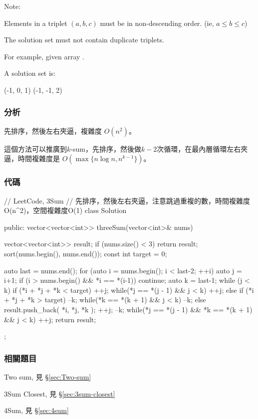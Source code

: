 Note:
\begindot
\item Elements in a triplet $(a,b,c)$ must be in non-descending order. (ie, $a \leq b \leq c$)
\item The solution set must not contain duplicate triplets.
\myenddot

For example, given array .

A solution set is:
\begin{Code}
(-1, 0, 1)
(-1, -1, 2)
\end{Code}


\subsubsection{分析}
先排序，然後左右夾逼，複雜度 $O(n^2)$。

這個方法可以推廣到$k$-sum，先排序，然後做$k-2$次循環，在最內層循環左右夾逼，時間複雜度是 $O(\max\{n \log n, n^{k-1}\})$。


\subsubsection{代碼}
\begin{Code}
// LeetCode, 3Sum
// 先排序，然後左右夾逼，注意跳過重複的數，時間複雜度O(n^2)，空間複雜度O(1)
class Solution {
    public:
    vector<vector<int>> threeSum(vector<int>& nums) {
        vector<vector<int>> result;
        if (nums.size() < 3) return result;
        sort(nums.begin(), nums.end());
        const int target = 0;
		
        auto last = nums.end();
        for (auto i = nums.begin(); i < last-2; ++i) {
            auto j = i+1;
            if (i > nums.begin() && *i == *(i-1)) continue;
            auto k = last-1;
            while (j < k) {
                if (*i + *j + *k < target) {
                    ++j;
                    while(*j == *(j - 1) && j < k) ++j;
                } else if (*i + *j + *k > target) {
                    --k;
                    while(*k == *(k + 1) && j < k) --k;
                } else {
                    result.push_back({ *i, *j, *k });
                    ++j;
                    --k;
                    while(*j == *(j - 1) && *k == *(k + 1) && j < k) ++j;
                }
            }
        }
        return result;
    }
};
\end{Code}


\subsubsection{相關題目}
\begindot
\item Two sum, 見 \S \ref{sec:Two-sum}
\item 3Sum Closest, 見 \S \ref{sec:3sum-closest}
\item 4Sum, 見 \S \ref{sec:4sum}
\myenddot

